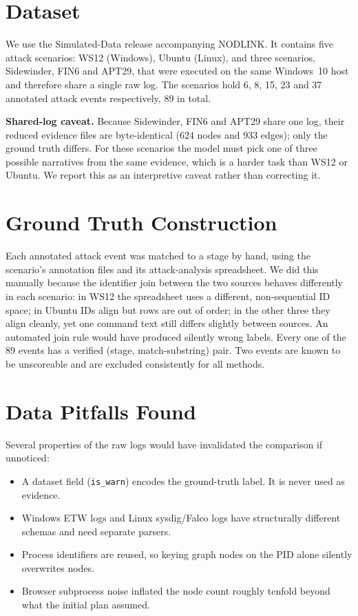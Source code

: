 \documentclass[a4paper, 12pt]{report}
\theoremstyle{definition}
\begin{document}
\section{Dataset}
We use the Simulated-Data release accompanying NODLINK. It contains five attack scenarios: WS12 (Windows), Ubuntu (Linux), and three scenarios, Sidewinder, FIN6 and APT29, that were executed on the same Windows~10 host and therefore share a single raw log. The scenarios hold 6, 8, 15, 23 and 37 annotated attack events respectively, 89 in total.

\textbf{Shared-log caveat.} Because Sidewinder, FIN6 and APT29 share one log, their reduced evidence files are byte-identical (624 nodes and 933 edges); only the ground truth differs. For these scenarios the model must pick one of three possible narratives from the same evidence, which is a harder task than WS12 or Ubuntu. We report this as an interpretive caveat rather than correcting it.

\section{Ground Truth Construction}
Each annotated attack event was matched to a stage by hand, using the scenario's annotation files and its attack-analysis spreadsheet. We did this manually because the identifier join between the two sources behaves differently in each scenario: in WS12 the spreadsheet uses a different, non-sequential ID space; in Ubuntu IDs align but rows are out of order; in the other three they align cleanly, yet one command text still differs slightly between sources. An automated join rule would have produced silently wrong labels. Every one of the 89 events has a verified (stage, match-substring) pair. Two events are known to be unscoreable and are excluded consistently for all methods.

\section{Data Pitfalls Found}
Several properties of the raw logs would have invalidated the comparison if unnoticed:
\begin{itemize}
	\item A dataset field (\texttt{is\_warn}) encodes the ground-truth label. It is never used as evidence.
	\item Windows ETW logs and Linux sysdig/Falco logs have structurally different schemas and need separate parsers.
	\item Process identifiers are reused, so keying graph nodes on the PID alone silently overwrites nodes.
	\item Browser subprocess noise inflated the node count roughly tenfold beyond what the initial plan assumed.
\end{itemize}
\end{document}
